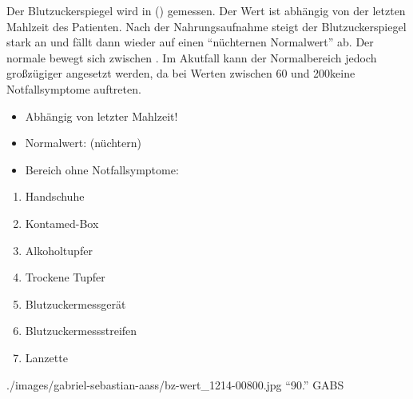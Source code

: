 {
Der Blutzuckerspiegel wird in 
(\MgDl{}) 
gemessen. Der
Wert ist abhängig von der letzten Mahlzeit des Patienten.
Nach der Nahrungsaufnahme steigt der Blutzuckerspiegel stark
an und fällt dann wieder auf einen \enquote{nüchternen
Normalwert} ab. Der normale 
bewegt sich zwischen  
. Im
Akutfall kann der Normalbereich jedoch großzügiger
angesetzt werden, da bei Werten zwischen 60 und 200\MgDl*
keine Notfallsymptome auftreten.
\cite{HeroldInnereMedizin2012}
}{
\begin{itemize}
    \item Abhängig von letzter Mahlzeit!
    \item Normalwert: \MgDl*
    (nüchtern)
    \item Bereich ohne Notfallsymptome:
    \MgDl*
\end{itemize}
}{}{}{}

{
\begin{enumerate}
  \item Handschuhe
  \item Kontamed-Box
  \item Alkoholtupfer
  \item Trockene Tupfer
  \item Blutzuckermessgerät
  \item Blutzuckermessstreifen
  \item Lanzette
\end{enumerate}
}
{}
{./images/gabriel-sebastian-aass/bz-wert_1214-00800.jpg}
{\enquote{90\MgDl*.}}
{GABS}


